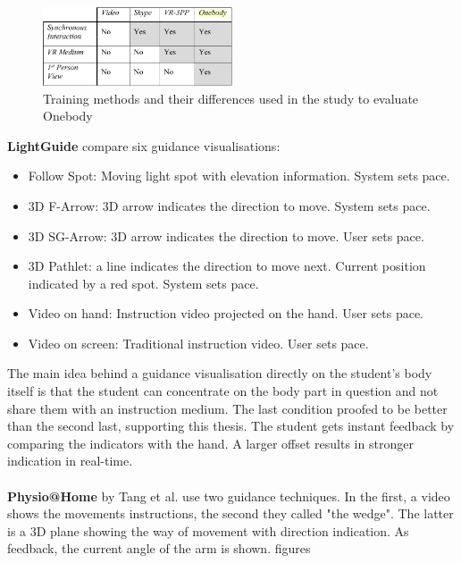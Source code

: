 \begin{figure}
	\centering
	\includegraphics[width=0.5\textwidth]{img/onebody_training_methods.PNG}
	\caption{Training methods and their differences used in the study to evaluate Onebody \cite{Hoang2016}}
	\label{fig:ob2}
\end{figure}
\textbf{LightGuide} \cite{Sodhi2012} compare six guidance visualisations:
\begin{itemize}
	\item Follow Spot: Moving light spot with elevation information. System sets pace.
	\item 3D F-Arrow: 3D arrow indicates the direction to move. System sets pace.
	\item 3D SG-Arrow: 3D arrow indicates the direction to move. User sets pace.
	\item 3D Pathlet: a line indicates the direction to move next. Current position indicated by a red spot. System sets pace.
	\item Video on hand: Instruction video projected on the hand. User sets pace.
	\item Video on screen: Traditional instruction video. User sets pace.
\end{itemize}
The main idea behind a guidance visualisation directly on the student's body itself is that the student can concentrate on the body part in question and not share them with an instruction medium. The last condition proofed to be better than the second last, supporting this thesis.
The student gets instant feedback by comparing the indicators with the hand. A larger offset results in stronger indication in real-time.\\ \\

\textbf{Physio@Home} by Tang et al. \cite{Tang2015} use two guidance techniques. In the first, a video shows the movements instructions, the second they called "the wedge". The latter is a 3D plane showing the way of movement with direction indication. As feedback, the current angle of the arm is shown. \todo figures

